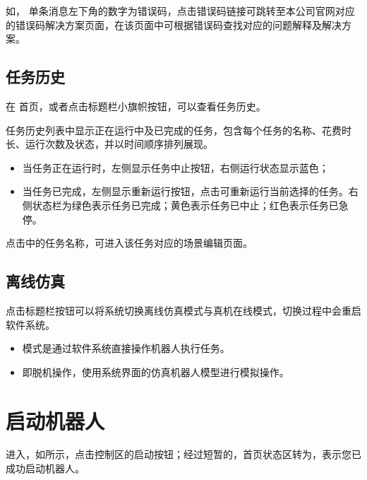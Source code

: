 如，
单条消息左下角的数字为错误码，点击错误码链接可跳转至本公司官网对应的错误码解决方案页面，在该页面中可根据错误码查找对应的问题解释及解决方案。

\subsection{任务历史}
\label{sec:任务历史}
在 \LM 首页，或者点击标题栏小旗帜按钮，可以查看任务历史。

任务历史列表中显示正在运行中及已完成的任务，包含每个任务的名称、花费时长、运行次数及状态，并以时间顺序排列展现。

\begin{itemize}
	\item 当任务正在运行时，左侧显示任务中止按钮，右侧运行状态显示蓝色； 
	\item 当任务已完成，左侧显示重新运行按钮，点击可重新运行当前选择的任务。右侧状态栏为绿色表示任务已完成；黄色表示任务已中止；红色表示任务已急停。
\end{itemize}

点击中的任务名称，可进入该任务对应的场景编辑页面。


\subsection{离线仿真}

点击标题栏按钮可以将系统切换离线仿真模式与真机在线模式，切换过程中会重启软件系统。

\begin{itemize}
\item {}模式是通过软件系统直接操作机器人执行任务。
\item {}即脱机操作，使用系统界面的仿真机器人模型进行模拟操作。
\end{itemize}


\section{启动机器人}
进入\LM ，如所示，点击控制区的启动按钮；经过短暂的，首页状态区转为，表示您已成功启动机器人。

